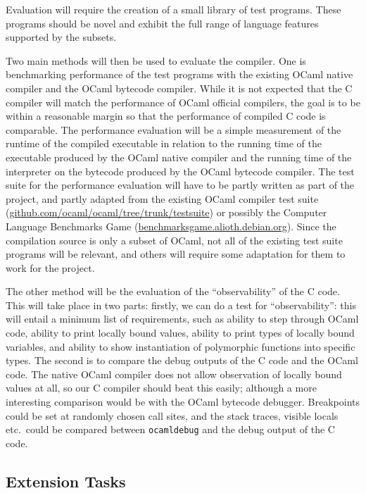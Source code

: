 Evaluation will require the creation of a small library of test programs. These
programs should be novel and exhibit the full range of language features
supported by the subsets.

Two main methods will then be used to evaluate the compiler. One is
benchmarking performance of the test programs with the existing OCaml native
compiler and the OCaml bytecode compiler. While it is not expected that the C
compiler will match the performance of OCaml official compilers, the goal is to
be within a reasonable margin so that the performance of compiled C code is
comparable. The performance evaluation will be a simple measurement of the
runtime of the compiled executable in relation to the running time of the
executable produced by the OCaml native compiler and the running time of the
interpreter on the bytecode produced by the OCaml bytecode compiler. The test
suite for the performance evaluation will have to be partly written as part of
the project, and partly adapted from the existing OCaml compiler test suite
(\url{github.com/ocaml/ocaml/tree/trunk/testsuite}) or possibly the Computer
Language Benchmarks Game (\url{benchmarksgame.alioth.debian.org}). Since the
compilation source is only a subset of OCaml, not all of the existing test
suite programs will be relevant, and others will require some adaptation for
them to work for the project.

The other method will be the evaluation of the ``observability'' of the C code.
This will take place in two parts: firstly, we can do a test for
``observability'': this will entail a minimum list of requirements, such as
ability to step through OCaml code, ability to print locally bound values,
ability to print types of locally bound variables, and ability to show
instantiation of polymorphic functions into specific types. The second is to
compare the debug outputs of the C code and the OCaml code. The native OCaml
compiler does not allow observation of locally bound values at all, so our C
compiler should beat this easily; although a more interesting comparison would
be with the OCaml bytecode debugger. Breakpoints could be set at randomly
chosen call sites, and the stack traces, visible locals etc.\ could be compared
between \texttt{ocamldebug} and the debug output of the C code.

\subsection*{Extension Tasks}

